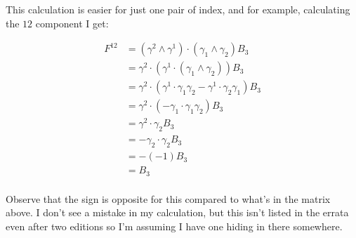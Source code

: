 This calculation is easier for just one pair of index, and for example, calculating the $12$ component I get:

\begin{align*}
F^{12} 
&= (\gamma^2 \wedge \gamma^1) \cdot ( \gamma_1 \wedge \gamma_2 ) B_3 \\
&= \gamma^2 \cdot (\gamma^1 \cdot ( \gamma_1 \wedge \gamma_2 )) B_3 \\
&= \gamma^2 \cdot ( \gamma^1 \cdot \gamma_1 \gamma_2 - \gamma^1 \cdot \gamma_2 \gamma_1 ) B_3 \\
&= \gamma^2 \cdot ( -\gamma_1 \cdot \gamma_1 \gamma_2 ) B_3 \\
&= \gamma^2 \cdot \gamma_2 B_3 \\
&= - \gamma_2 \cdot \gamma_2 B_3 \\
&= - (-1) B_3 \\
&= B_3 \\
\end{align*}

Observe that the sign is opposite for this compared to what's in the matrix above.  I don't see a mistake in my calculation, but this isn't listed in the errata even after two editions
so I'm assuming I have one hiding in there somewhere.

